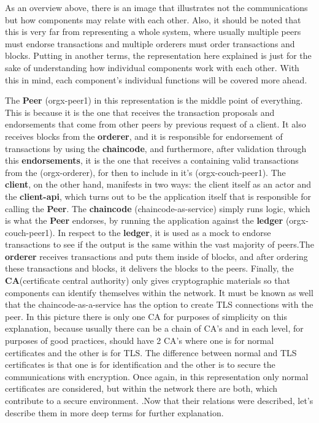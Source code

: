 As an overview above, there is an image that illustrates not the communications but how components 
may relate with each other. Also, it should be noted that this is very far from representing a whole system, where usually 
multiple peers must endorse transactions and multiple orderers must order transactions and blocks. Putting in another terms, 
the representation here explained is just for the sake of understanding how individual components work with each other. With 
this in mind, each component's individual functions will be covered more ahead.

The \textbf{Peer} (orgx-peer1) in this representation is the middle point of everything. This is because it is the one that receives 
the transaction proposals and endorsements that come from other peers by previous request of a client. It also receives blocks 
from the \textbf{orderer}, and it is responsible for endorsement of transactions by using the \textbf{chaincode}, and furthermore, 
after validation through this \textbf{endorsements}, it is the one that receives a  containing valid transactions 
from the  (orgx-orderer), for then to include in it's  (orgx-couch-peer1). The \textbf{client}, on the other
hand, manifests in two ways: the client itself as an actor and the \textbf{client-api}, which turns out to be the application 
itself that is responsible for calling the \textbf{Peer}. The \textbf{chaincode} (chaincode-as-service) simply runs logic, which is 
what the \textbf{Peer} endorses, by running the application against the \textbf{ledger} (orgx-couch-peer1). In respect to the 
\textbf{ledger}, it is used as a mock to endorse transactions to see if the output is the same within the vast majority 
of peers.The \textbf{orderer} receives transactions and puts them inside of blocks, and after ordering these transactions and 
blocks, it delivers the blocks to the peers. Finally, the \textbf{CA}(certificate central authority) only gives cryptographic 
materials so that components can identify themselves within the network. It must be known as well that the chaincode-as-a-service 
has the option to create TLS connections with the peer. In this picture there is only one CA for purposes of simplicity on this 
explanation, because usually there can be a chain of CA's and in each level, for purposes of good practices, should have 2 CA's 
where one is for normal certificates and the other is for TLS. The difference between normal and TLS certificates is that 
one is for identification and the other is to secure the communications with encryption. Once again, in this representation only 
normal certificates are considered, but within the network there are both, which contribute to a secure 
environment. \cite{rfc5280}.Now that their relations were described, let's describe them in more deep terms for further explanation.

